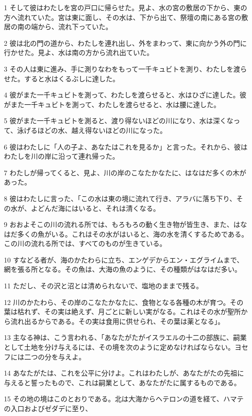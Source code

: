 \par 1 そして彼はわたしを宮の戸口に帰らせた。見よ、水の宮の敷居の下から、東の方へ流れていた。宮は東に面し、その水は、下から出て、祭壇の南にある宮の敷居の南の端から、流れ下っていた。
\par 2 彼は北の門の道から、わたしを連れ出し、外をまわって、東に向かう外の門に行かせた。見よ、水は南の方から流れ出ていた。
\par 3 その人は東に進み、手に測りなわをもって一千キュビトを測り、わたしを渡らせた。すると水はくるぶしに達した。
\par 4 彼がまた一千キュビトを測って、わたしを渡らせると、水はひざに達した。彼がまた一千キュビトを測って、わたしを渡らせると、水は腰に達した。
\par 5 彼がまた一千キュビトを測ると、渡り得ないほどの川になり、水は深くなって、泳げるほどの水、越え得ないほどの川になった。
\par 6 彼はわたしに「人の子よ、あなたはこれを見るか」と言った。それから、彼はわたしを川の岸に沿って連れ帰った。
\par 7 わたしが帰ってくると、見よ、川の岸のこなたかなたに、はなはだ多くの木があった。
\par 8 彼はわたしに言った、「この水は東の境に流れて行き、アラバに落ち下り、その水が、よどんだ海にはいると、それは清くなる。
\par 9 おおよそこの川の流れる所では、もろもろの動く生き物が皆生き、また、はなはだ多くの魚がいる。これはその水がはいると、海の水を清くするためである。この川の流れる所では、すべてのものが生きている。
\par 10 すなどる者が、海のかたわらに立ち、エンゲデからエン・エグライムまで、網を張る所となる。その魚は、大海の魚のように、その種類がはなはだ多い。
\par 11 ただし、その沢と沼とは清められないで、塩地のままで残る。
\par 12 川のかたわら、その岸のこなたかなたに、食物となる各種の木が育つ。その葉は枯れず、その実は絶えず、月ごとに新しい実がなる。これはその水が聖所から流れ出るからである。その実は食用に供せられ、その葉は薬となる」。
\par 13 主なる神は、こう言われる、「あなたがたがイスラエルの十二の部族に、嗣業として土地を分け与えるには、その境を次のように定めなければならない。ヨセフには二つの分を与えよ。
\par 14 あなたがたは、これを公平に分けよ。これはわたしが、あなたがたの先祖に与えると誓ったもので、これは嗣業として、あなたがたに属するものである。
\par 15 その地の境はこのとおりである。北は大海からヘテロンの道を経て、ハマテの入口およびゼダデに至り、
